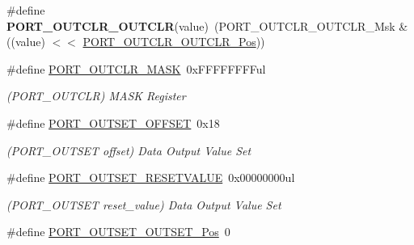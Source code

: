\begin{DoxyCompactItemize}
\item 
\hypertarget{group___s_a_m_l21___p_o_r_t_ga770d56801d959c8fb260e82d5df7ce60}{}\#define {\bfseries P\+O\+R\+T\+\_\+\+O\+U\+T\+C\+L\+R\+\_\+\+O\+U\+T\+C\+L\+R}(value)~(P\+O\+R\+T\+\_\+\+O\+U\+T\+C\+L\+R\+\_\+\+O\+U\+T\+C\+L\+R\+\_\+\+Msk \& ((value) $<$$<$ \hyperlink{group___s_a_m_l21___p_o_r_t_gaa448fb60871992079921f4c31b2ab0a0}{P\+O\+R\+T\+\_\+\+O\+U\+T\+C\+L\+R\+\_\+\+O\+U\+T\+C\+L\+R\+\_\+\+Pos}))\label{group___s_a_m_l21___p_o_r_t_ga770d56801d959c8fb260e82d5df7ce60}

\item 
\hypertarget{group___s_a_m_l21___p_o_r_t_ga600b1512b7fcc7de565adb38783650fd}{}\#define \hyperlink{group___s_a_m_l21___p_o_r_t_ga600b1512b7fcc7de565adb38783650fd}{P\+O\+R\+T\+\_\+\+O\+U\+T\+C\+L\+R\+\_\+\+M\+A\+S\+K}~0x\+F\+F\+F\+F\+F\+F\+F\+Ful\label{group___s_a_m_l21___p_o_r_t_ga600b1512b7fcc7de565adb38783650fd}

\begin{DoxyCompactList}\small\item\em (P\+O\+R\+T\+\_\+\+O\+U\+T\+C\+L\+R) M\+A\+S\+K Register \end{DoxyCompactList}\item 
\hypertarget{group___s_a_m_l21___p_o_r_t_ga2836c334826cf0fa63d6be8319f3eaa4}{}\#define \hyperlink{group___s_a_m_l21___p_o_r_t_ga2836c334826cf0fa63d6be8319f3eaa4}{P\+O\+R\+T\+\_\+\+O\+U\+T\+S\+E\+T\+\_\+\+O\+F\+F\+S\+E\+T}~0x18\label{group___s_a_m_l21___p_o_r_t_ga2836c334826cf0fa63d6be8319f3eaa4}

\begin{DoxyCompactList}\small\item\em (P\+O\+R\+T\+\_\+\+O\+U\+T\+S\+E\+T offset) Data Output Value Set \end{DoxyCompactList}\item 
\hypertarget{group___s_a_m_l21___p_o_r_t_ga703a3d3fb11897242e5edbdda11d3e01}{}\#define \hyperlink{group___s_a_m_l21___p_o_r_t_ga703a3d3fb11897242e5edbdda11d3e01}{P\+O\+R\+T\+\_\+\+O\+U\+T\+S\+E\+T\+\_\+\+R\+E\+S\+E\+T\+V\+A\+L\+U\+E}~0x00000000ul\label{group___s_a_m_l21___p_o_r_t_ga703a3d3fb11897242e5edbdda11d3e01}

\begin{DoxyCompactList}\small\item\em (P\+O\+R\+T\+\_\+\+O\+U\+T\+S\+E\+T reset\+\_\+value) Data Output Value Set \end{DoxyCompactList}\item 
\hypertarget{group___s_a_m_l21___p_o_r_t_gab15b9d26363709ae77584b0f8140ba42}{}\#define \hyperlink{group___s_a_m_l21___p_o_r_t_gab15b9d26363709ae77584b0f8140ba42}{P\+O\+R\+T\+\_\+\+O\+U\+T\+S\+E\+T\+\_\+\+O\+U\+T\+S\+E\+T\+\_\+\+Pos}~0\label{group___s_a_m_l21___p_o_r_t_gab15b9d26363709ae77584b0f8140ba42}


\end{DoxyCompactItemize}
